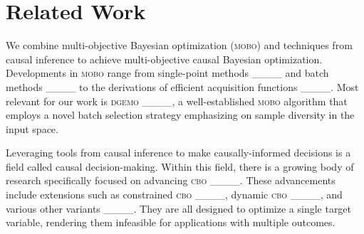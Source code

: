 \section{Related Work}
We combine multi-objective Bayesian optimization (\textsc{mobo}) and techniques from causal inference to achieve multi-objective causal Bayesian optimization.
Developments in \textsc{mobo} range from single-point methods ____ and batch methods ____ to the derivations of efficient acquisition functions ____. 
Most relevant for our work is \textsc{dgemo} ____, a well-established \textsc{mobo} algorithm that employs a novel batch selection strategy emphasizing on sample diversity in the input space.

Leveraging tools from causal inference to make causally-informed decisions is a field called causal decision-making. Within this field, there is a growing body of research specifically focused on advancing \textsc{cbo} ____. These advancements include extensions such as constrained \textsc{cbo} ____, dynamic \textsc{cbo} ____, and various other variants ____. They are all designed to optimize a single target variable, rendering them infeasible for applications with multiple outcomes.